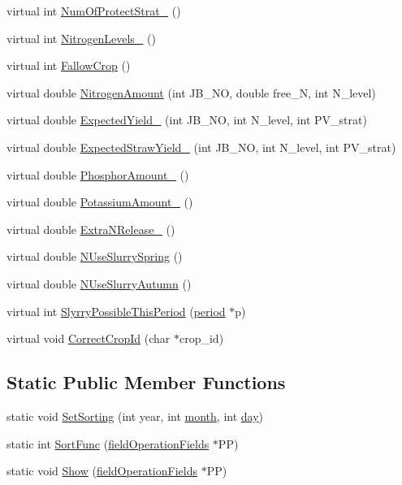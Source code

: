 \begin{DoxyCompactItemize}
\item 
virtual int \hyperlink{classstatic_crop_a4d3d767f569f48eb68ffa76822302467}{NumOfProtectStrat\_\-} ()
\item 
virtual int \hyperlink{classstatic_crop_a32b69ed138beaed150efa74d18e82d8e}{NitrogenLevels\_\-} ()
\item 
virtual int \hyperlink{classstatic_crop_ac8b14325e2ab05247e9b61e3af331f24}{FallowCrop} ()
\item 
virtual double \hyperlink{classstatic_crop_af3aa85321a8a75406f8a0751b71587d0}{NitrogenAmount} (int JB\_\-NO, double free\_\-N, int N\_\-level)
\item 
virtual double \hyperlink{classstatic_crop_ab7b9a8ecb31b10c4dcf44f13000e2f8c}{ExpectedYield\_\-} (int JB\_\-NO, int N\_\-level, int PV\_\-strat)
\item 
virtual double \hyperlink{classstatic_crop_a884a8335aebc5effa3fecdb75af3ca85}{ExpectedStrawYield\_\-} (int JB\_\-NO, int N\_\-level, int PV\_\-strat)
\item 
virtual double \hyperlink{classstatic_crop_abaa5c59d4074d47dedc79172f8326e08}{PhosphorAmount\_\-} ()
\item 
virtual double \hyperlink{classstatic_crop_a41fee98d728c7670e6acb504a9b3459d}{PotassiumAmount\_\-} ()
\item 
virtual double \hyperlink{classstatic_crop_afe0cb8a7831afa941a37338f05227d67}{ExtraNRelease\_\-} ()
\item 
virtual double \hyperlink{classstatic_crop_ae7d21ab4afc8d8355d231566e8d87b1b}{NUseSlurrySpring} ()
\item 
virtual double \hyperlink{classstatic_crop_a6b89d7839db435c7ceafa2755312182e}{NUseSlurryAutumn} ()
\item 
virtual int \hyperlink{classstatic_crop_ada7c8c797de629277a5ba0b0a4a3c17e}{SlyrryPossibleThisPeriod} (\hyperlink{classperiod}{period} $\ast$p)
\item 
virtual void \hyperlink{classstatic_crop_ad41ac9fc010354e58bdb6c40aac4a598}{CorrectCropId} (char $\ast$crop\_\-id)
\end{DoxyCompactItemize}
\subsection*{Static Public Member Functions}
\begin{DoxyCompactItemize}
\item 
static void \hyperlink{classstatic_crop_aa6a248194baae477b06a0e234693e3c6}{SetSorting} (int year, int \hyperlink{classstatic_crop_a2c8bc8fdbc9824534c54f9f74a17623e}{month}, int \hyperlink{classstatic_crop_a5f633c8fed33e9051eb776b9781c36ac}{day})
\item 
static int \hyperlink{classstatic_crop_a19f3113e54899e6b0e31fa47a40877e5}{SortFunc} (\hyperlink{classfield_operation_fields}{fieldOperationFields} $\ast$PP)
\item 
static void \hyperlink{classstatic_crop_acd932ec9d52178e685bc647d7a66a038}{Show} (\hyperlink{classfield_operation_fields}{fieldOperationFields} $\ast$PP)
\end{DoxyCompactItemize}
